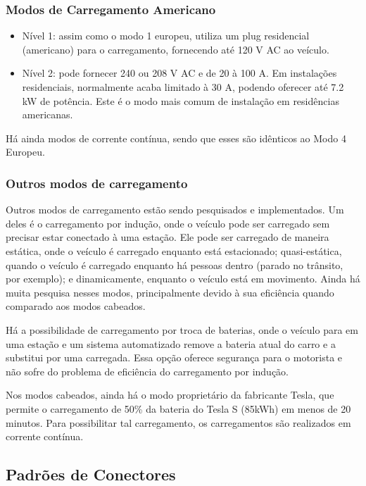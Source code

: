       \subsubsection{Modos de Carregamento Americano}

        \begin{itemize}
          \item Nível 1: assim como o modo 1 europeu, utiliza um plug residencial (americano) para o carregamento, fornecendo até 120 V AC ao veículo.
          \item Nível 2: pode fornecer 240 ou 208 V AC e de 20 à 100 A. Em instalações residenciais, normalmente acaba limitado à 30 A, podendo oferecer até 7.2 kW de potência. Este é o modo mais comum de instalação em residências americanas.
        \end{itemize}

        Há ainda modos de corrente contínua, sendo que esses são idênticos ao Modo 4 Europeu.

      \subsubsection{Outros modos de carregamento}

        Outros modos de carregamento estão sendo pesquisados e implementados. Um deles é o carregamento por indução, onde o veículo pode ser carregado sem precisar estar conectado à uma estação. Ele pode ser carregado de maneira estática, onde o veículo é carregado enquanto está estacionado; quasi-estática, quando o veículo é carregado enquanto há pessoas dentro (parado no trânsito, por exemplo); e dinamicamente, enquanto o veículo está em movimento. Ainda há muita pesquisa nesses modos, principalmente devido à sua eficiência quando comparado aos modos cabeados.

        Há a possibilidade de carregamento por troca de baterias, onde o veículo para em uma estação e um sistema automatizado remove a bateria atual do carro e a substitui por uma carregada. Essa opção oferece segurança para o motorista e não sofre do problema de eficiência do carregamento por indução.

        Nos modos cabeados, ainda há o modo proprietário da fabricante Tesla, que permite o carregamento de 50\% da bateria do Tesla S (85kWh) em menos de 20 minutos. Para possibilitar tal carregamento, os carregamentos são realizados em corrente contínua.

    \subsection{Padrões de Conectores}

